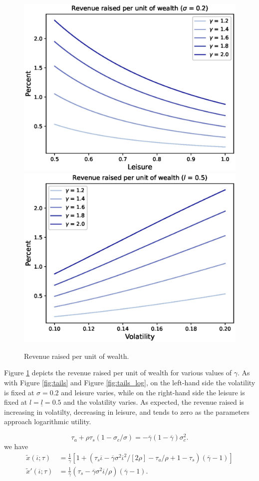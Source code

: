 \documentclass[11pt]{article}
\theoremstyle{plain}
\begin{document}
\begin{figure}[!htb]
\centering
\includegraphics[width=0.49\linewidth]{rev_lgrid}
\includegraphics[width=0.49\linewidth]{rev_sig_grid}
\caption{Revenue raised per unit of wealth.}\label{fig:rev}
\end{figure}

Figure \ref{fig:rev} depicts the revenue raised per unit of wealth for various values of $\gamma$. As with Figure \ref{fig:tails} and Figure \ref{fig:tails_log}, on the left-hand side the volatility is fixed at $\sigma=0.2$ and leisure varies, while on the right-hand side the leisure is fixed at $l = \underline{l} = 0.5$ and the volatility varies. As expected, the revenue raised is increasing in volatilty, decreasing in leisure, and tends to zero as the parameters approach logarithmic utility. 

\iffalse
$$
\tau_a + \rho\tau_s(1 - \sigma_c/\sigma) = -\overline{\gamma}(1-\overline{\gamma}) \sigma_c^2. 
$$
we have 
\begin{align*}
\tilde{x}(\overline{\iota}; \tau) & = \frac{1}{\overline{\gamma}}{\left[1 + {\left(\tau_s\overline{\iota} - \overline{\gamma}\sigma^2\overline{\iota}^2/[2\rho] -\tau_a/\rho + 1 - \tau_s\right)}(\overline{\gamma}-1)\right]}
\\ \tilde{x}'(\overline{\iota}; \tau) & = \frac{1}{\overline{\gamma}}{\left(\tau_s - \overline{\gamma}\sigma^2\overline{\iota}/\rho\right)}(\overline{\gamma}-1).
\end{align*}
\end{document}

